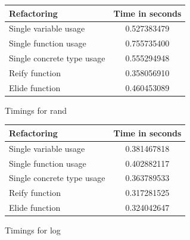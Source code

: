 \begin{figure}[H]
\begin{center}
    \begin{tabular}{ | l | c |}
    \hline
    \textbf{Refactoring} & \textbf{Time in seconds} \\ \hline
    Single variable usage &  0.527383479 \\ \hline
    Single function usage &  0.755735400 \\ \hline
    Single concrete type usage  & 0.555294948 \\ \hline
    Reify function &   0.358056910 \\ \hline
    Elide function & 0.460453089 \\ \hline
    \end{tabular}
\end{center}

\caption{Timings for rand}
\label{Fig:rand}
\end{figure}

\begin{figure}[H]
\begin{center}
    \begin{tabular}{ | l | c |}
    \hline
    \textbf{Refactoring} & \textbf{Time in seconds} \\ \hline
    Single variable usage &  0.381467818  \\ \hline
    Single function usage &   0.402882117  \\ \hline
    Single concrete type usage  &  0.363789533 \\ \hline
    Reify function &   0.317281525 \\ \hline
    Elide function &  0.324042647 \\ \hline
    \end{tabular}
\end{center}

\caption{Timings for log}
\label{Fig:log}
\end{figure}

